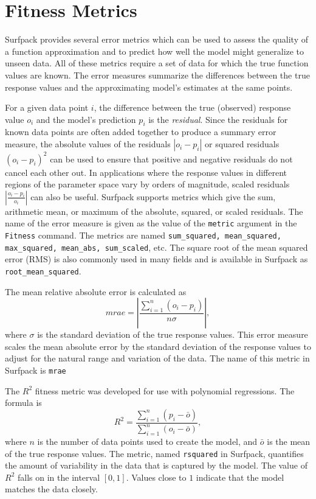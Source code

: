 \documentclass{article}
\begin{document}
\section{Fitness Metrics}
Surfpack provides several error metrics which can be used to assess the quality of a function approximation and to predict how well the model might generalize to unseen data.  All of these metrics require a set of data for which the true function values are known.  The error measures summarize the differences between the true response values and the approximating model's estimates at the same points.

For a given data point $i$, the difference between the true (observed) response value $o_i$ and the model's prediction $p_i$ is the {\em residual}.  Since the residuals for known data points are often added together to produce a summary error measure, the absolute values of the residuals $|o_i - p_i|$ or squared residuals $(o_i - p_i)^2$ can be used to ensure that positive and negative residuals do not cancel each other out.  In applications where the response values in different regions of the parameter space vary by orders of magnitude, scaled residuals $|\frac{o_i - p_i}{o_i}|$ can also be useful.  Surfpack supports metrics which give the sum, arithmetic mean, or maximum of the absolute, squared, or scaled residuals.  The name of the error measure is given as the value of the \texttt{metric} argument in the \texttt{Fitness} command.  The metrics are named \texttt{sum\_squared, mean\_squared, max\_squared, mean\_abs, sum\_scaled}, etc.  The square root of the mean squared error (RMS) is also commonly used in many fields and is available in Surfpack as \texttt{root\_mean\_squared}.  

The mean relative absolute error is calculated as
\begin{equation}
  mrae = \left| \frac{ \sum_{i=1}^{n}{\left(o_i - p_i\right)}}{n\sigma} \right|,
\end{equation}
where $\sigma$ is the standard deviation of the true response values.  This error measure scales the mean absolute error by the standard deviation of the response values to adjust for the natural range and variation of the data.  The name of this metric in Surfpack is \texttt{mrae}

The $R^2$ fitness metric was developed for use with polynomial regressions.  The formula is
\begin{equation}
  R^2 = \frac{\sum_{i=1}^{n}{\left(p_i - \bar{o}\right)}}{ \sum_{i=1}^{n}{\left(o_i - \bar{o}\right)}},
\end{equation}
where $n$ is the number of data points used to create the model, and $\bar{o}$ is the mean of the true response values.  The metric, named \texttt{rsquared} in Surfpack, quantifies the amount of variability in the data that is captured by the model.  The value of $R^2$ falls on in the interval $[0,1]$.  Values close to $1$ indicate that the model matches the data closely.
\end{document}
